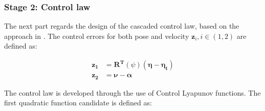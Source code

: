 \subsubsection{Stage 2: Control law}

The next part regards the design of the cascaded control law, based on the approach in \cite{Sørensen2016}. The control errors for both pose and velocity $\boldsymbol{z}_i, i\in (1,2)$ are defined as: 

\begin{align}\label{eq:Abz}
\boldsymbol{z_1} &= \boldsymbol{R^T}(\psi)(\boldsymbol{\eta - \eta_t})\\
\boldsymbol{z_2} &= \boldsymbol{\nu - \alpha}
\end{align}


The control law is developed through the use of Control Lyapunov functions. The first quadratic function candidate is defined as:





